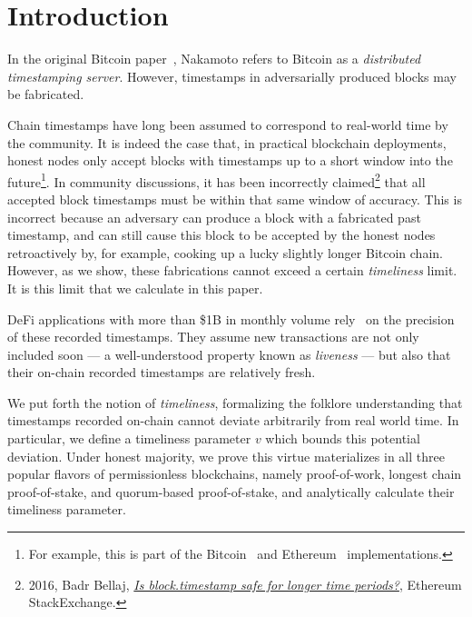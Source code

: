 \section{Introduction}
In the original Bitcoin paper~\cite{bitcoin}, Nakamoto refers to
Bitcoin as a \emph{distributed timestamping server}.
However, timestamps in adversarially produced blocks may be fabricated.

Chain timestamps have long been assumed to correspond to real-world time by the community.
It is indeed the case that, in practical blockchain deployments, honest nodes only accept
blocks with timestamps up to a short window into the future\footnote{
  For example, this is part of the Bitcoin~\cite{bitcoin-code-future-blocks}
  and Ethereum~\cite{geth-future-blocks} implementations.
}.
In community discussions, it has been incorrectly
claimed\footnote{2016, Badr Bellaj, \href{https://ethereum.stackexchange.com/questions/6795/is-block-timestamp-safe-for-longer-time-periods}{\emph{Is block.timestamp safe for longer time periods?}}, Ethereum StackExchange.}
that all accepted block timestamps must be within that same window of accuracy.
This is incorrect because an adversary can produce a block with a fabricated past timestamp,
and can still cause this block to be accepted by the honest nodes retroactively by, for example, cooking
up a lucky slightly longer Bitcoin chain. However, as we show, these fabrications
cannot exceed a certain \emph{timeliness} limit. It is this limit that we calculate in this paper.

DeFi applications with more than \$1B in monthly volume
rely~\cite{0x-timestamp} on the precision of these recorded timestamps.
They assume new transactions are not only
included soon --- a well-understood property known as \emph{liveness} ---
but also that their on-chain recorded timestamps are relatively fresh.

We put forth the notion of \emph{timeliness}, formalizing the folklore
understanding that timestamps recorded on-chain cannot deviate arbitrarily
from real world time. In particular, we define a timeliness parameter $v$ which bounds
this potential deviation. Under honest majority, we prove this virtue materializes in all three popular flavors of
permissionless blockchains, namely proof-of-work,
longest chain proof-of-stake, and quorum-based proof-of-stake, and analytically
calculate their timeliness parameter.

